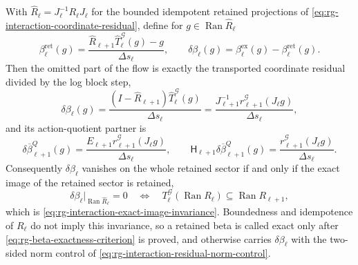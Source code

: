 With $\widehat R_\ell=J_\ell^{-1}R_\ell J_\ell$ for the bounded idempotent
retained projections of \eqref{eq:rg-interaction-coordinate-residual}, define for
$g\in\operatorname{Ran}\widehat R_\ell$
\begin{equation}
\beta_\ell^{\mathrm{ret}}(g)
=\frac{\widehat R_{\ell+1}\widehat T_\ell^{\mathcal G}(g)-g}{\Delta s_\ell},
\qquad
\delta\beta_\ell(g)
=\beta_\ell^{\mathrm{ex}}(g)-\beta_\ell^{\mathrm{ret}}(g).
\label{eq:rg-retained-beta}
\end{equation}
Then the omitted part of the flow is exactly the transported coordinate residual
divided by the log block step,
\begin{equation}
\delta\beta_\ell(g)
=\frac{(I-\widehat R_{\ell+1})\widehat T_\ell^{\mathcal G}(g)}{\Delta s_\ell}
=\frac{J_{\ell+1}^{-1}r_{\ell+1}^{\mathcal G}(J_\ell g)}{\Delta s_\ell},
\label{eq:rg-beta-residual-identity}
\end{equation}
and its action-quotient partner is
\begin{equation}
\delta\overline\beta_{\ell+1}^{Q}(g)
=\frac{E_{\ell+1}r_{\ell+1}^{\mathcal G}(J_\ell g)}{\Delta s_\ell},
\qquad
\mathsf H_{\ell+1}\delta\overline\beta_{\ell+1}^{Q}(g)
=\frac{r_{\ell+1}^{\mathcal G}(J_\ell g)}{\Delta s_\ell}.
\label{eq:rg-beta-residual-quotient}
\end{equation}
Consequently $\delta\beta_\ell$ vanishes on the whole retained sector if and
only if the exact image of the retained sector is retained,
\begin{equation}
\delta\beta_\ell\big|_{\operatorname{Ran}\widehat R_\ell}=0
\quad\Longleftrightarrow\quad
T_\ell^{\mathcal G}(\operatorname{Ran}R_\ell)\subseteq\operatorname{Ran}R_{\ell+1},
\label{eq:rg-beta-exactness-criterion}
\end{equation}
which is \eqref{eq:rg-interaction-exact-image-invariance}.  Boundedness and
idempotence of $R_\ell$ do not imply this invariance, so a retained beta is
called exact only after \eqref{eq:rg-beta-exactness-criterion} is proved, and
otherwise carries $\delta\beta_\ell$ with the two-sided norm control of
\eqref{eq:rg-interaction-residual-norm-control}. 

